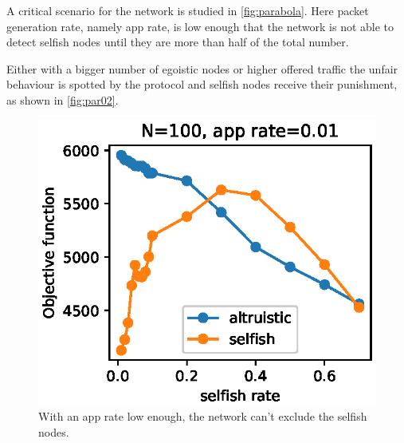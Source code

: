 \documentclass[conference,10.5pt]{IEEEtran}
\begin{document}
A critical scenario for the network is studied in \autoref{fig:parabola}. Here packet generation rate, namely app rate, is low enough that the network is not able to detect selfish nodes until they are more than half of the total number.

Either with a bigger number of egoistic nodes or higher offered traffic the unfair behaviour is spotted by the protocol and selfish nodes receive their punishment, as shown in \autoref{fig:par02}.

\begin{figure}[h]
  \includegraphics{figures/obj_func_vs_selfish_rate_parabola.eps}
  \caption{With an app rate low enough, the network can't exclude the selfish nodes.}
  \label{fig:parabola}
\end{figure}
\end{document}

